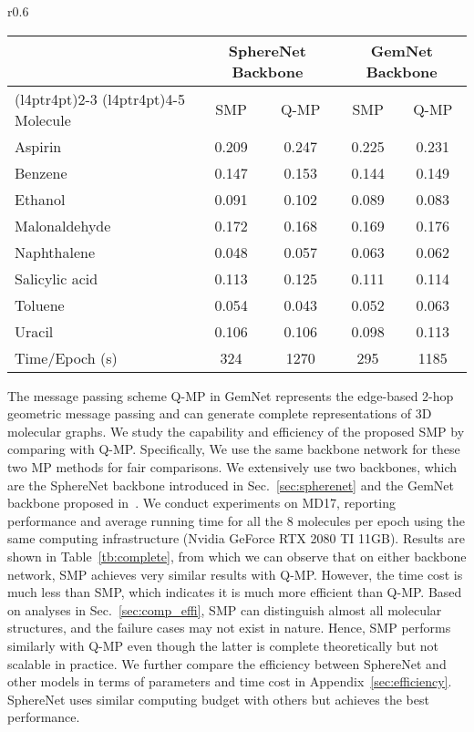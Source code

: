 \documentclass{article}
\begin{document}
\begin{wraptable}[15]{r}{0.6\textwidth}\vspace{-22 pt}
\centering 
\caption{Comparisons bewtween SMP and Q-MP on MD17 using two backbone networks.
}\label{tb:complete}
{\begin{tabular}{l cc | cc  }
            \bottomrule
            &\multicolumn{2}{c|}{SphereNet Backbone} & \multicolumn{2}{c}{GemNet Backbone}  \\
            \cmidrule(l{4pt}r{4pt}){2-3}
            \cmidrule(l{4pt}r{4pt}){4-5}
Molecule &             SMP & Q-MP &  SMP & Q-MP \\
\midrule
Aspirin &  0.209 &0.247 & 0.225 & 0.231 \\
Benzene  & 0.147 &0.153 & 0.144 & 0.149 \\
Ethanol &  0.091 &0.102 & 0.089 & 0.083 \\
Malonaldehyde & 0.172&0.168& 0.169 & 0.176\\
Naphthalene &  0.048&0.057& 0.063 & 0.062 \\
Salicylic acid & 0.113&0.125& 0.111 & 0.114 \\
Toluene  &  0.054&0.043 & 0.052 &0.063\\
Uracil &  0.106 &0.106 & 0.098 & 0.113\\
\hline
Time/Epoch (s) & 324 & 1270 &295 & 1185\\
\bottomrule
\end{tabular}}
\end{wraptable}
The message passing scheme Q-MP in GemNet represents the edge-based 2-hop
geometric message passing and can generate complete representations of
3D molecular graphs.
We study the capability and efficiency of the proposed SMP by comparing with Q-MP.
Specifically, We use the same backbone network for these two MP methods
for fair comparisons.
We extensively use two backbones, which are the SphereNet backbone introduced in 
Sec.~\ref{sec:spherenet} and the GemNet backbone proposed in~\cite{klicpera2021gemnet}.
We conduct experiments on MD17, reporting performance and average running time for all the 8 molecules per epoch
using the same computing infrastructure (Nvidia GeForce RTX 2080 TI 11GB).
Results are shown in Table~\ref{tb:complete}, from which we can observe
that on either backbone network, SMP achieves very similar results with Q-MP.
However, the time cost is much less than SMP, which indicates it is much more efficient
than Q-MP. Based on analyses in Sec.~\ref{sec:comp_effi}, SMP can distinguish
almost all molecular structures, and the failure cases may not exist in nature.
Hence, SMP performs similarly with Q-MP even though the latter is complete theoretically 
but not scalable in practice.
We further compare the efficiency between SphereNet and
other models in terms of parameters and time cost in Appendix~\ref{sec:efficiency}.
SphereNet uses similar computing budget with others but achieves the best performance.
\end{document}
